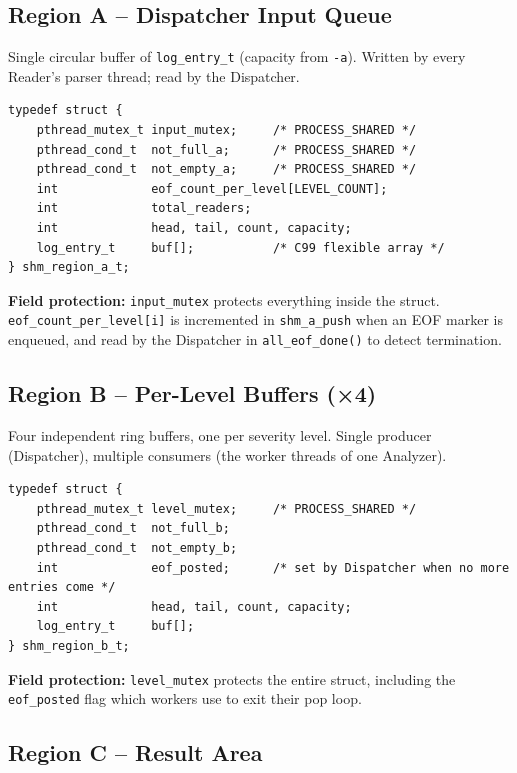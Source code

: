 \documentclass[11pt,a4paper]{article}
\newcommand{\code}[1]{\texttt{\small #1}}
\begin{document}
\subsection{Region A -- Dispatcher Input Queue}

Single circular buffer of \code{log\_entry\_t} (capacity from \code{-a}).
Written by every Reader's parser thread; read by the Dispatcher.

\begin{lstlisting}[style=Cstyle]
typedef struct {
    pthread_mutex_t input_mutex;     /* PROCESS_SHARED */
    pthread_cond_t  not_full_a;      /* PROCESS_SHARED */
    pthread_cond_t  not_empty_a;     /* PROCESS_SHARED */
    int             eof_count_per_level[LEVEL_COUNT];
    int             total_readers;
    int             head, tail, count, capacity;
    log_entry_t     buf[];           /* C99 flexible array */
} shm_region_a_t;
\end{lstlisting}

\textbf{Field protection:} \code{input\_mutex} protects everything inside
the struct. \code{eof\_count\_per\_level[i]} is incremented in
\code{shm\_a\_push} when an EOF marker is enqueued, and read by the
Dispatcher in \code{all\_eof\_done()} to detect termination.

\subsection{Region B -- Per-Level Buffers (×4)}

Four independent ring buffers, one per severity level. Single producer
(Dispatcher), multiple consumers (the worker threads of one Analyzer).

\begin{lstlisting}[style=Cstyle]
typedef struct {
    pthread_mutex_t level_mutex;     /* PROCESS_SHARED */
    pthread_cond_t  not_full_b;
    pthread_cond_t  not_empty_b;
    int             eof_posted;      /* set by Dispatcher when no more entries come */
    int             head, tail, count, capacity;
    log_entry_t     buf[];
} shm_region_b_t;
\end{lstlisting}

\textbf{Field protection:} \code{level\_mutex} protects the entire
struct, including the \code{eof\_posted} flag which workers use to exit
their pop loop.

\subsection{Region C -- Result Area}
\end{document}
